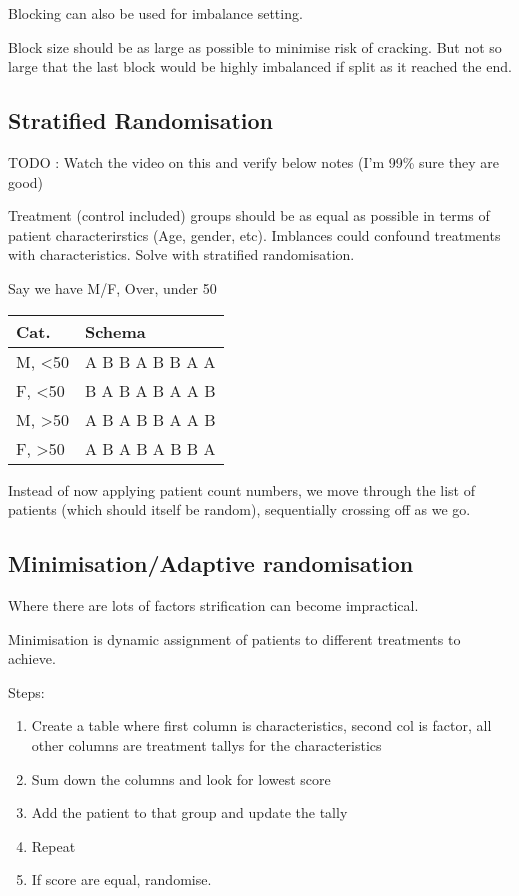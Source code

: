 \documentclass[
  letterpaper,
  DIV=11,
  numbers=noendperiod]{scrreprt}
\providecommand{\tightlist}{%
  \setlength{\itemsep}{0pt}\setlength{\parskip}{0pt}}\usepackage{longtable,booktabs,array}
\begin{document}
Blocking can also be used for imbalance setting.

Block size should be as large as possible to minimise risk of cracking.
But not so large that the last block would be highly imbalanced if split
as it reached the end.

\hypertarget{stratified-randomisation}{%
\subsection{Stratified Randomisation}\label{stratified-randomisation}}

TODO : Watch the video on this and verify below notes (I'm 99\% sure
they are good)

Treatment (control included) groups should be as equal as possible in
terms of patient characterirstics (Age, gender, etc). Imblances could
confound treatments with characteristics. Solve with stratified
randomisation.

Say we have M/F, Over, under 50

\begin{longtable}[]{@{}ll@{}}
\toprule()
Cat. & Schema \\
\midrule()
\endhead
M, \textless50 & A B B A B B A A \\
F, \textless50 & B A B A B A A B \\
M, \textgreater50 & A B A B B A A B \\
F, \textgreater50 & A B A B A B B A \\
\bottomrule()
\end{longtable}

Instead of now applying patient count numbers, we move through the list
of patients (which should itself be random), sequentially crossing off
as we go.

\hypertarget{minimisationadaptive-randomisation}{%
\subsection{Minimisation/Adaptive
randomisation}\label{minimisationadaptive-randomisation}}

Where there are lots of factors strification can become impractical.

Minimisation is dynamic assignment of patients to different treatments
to achieve.

Steps:

\begin{enumerate}
\def\labelenumi{\arabic{enumi})}
\tightlist
\item
  Create a table where first column is characteristics, second col is
  factor, all other columns are treatment tallys for the characteristics
\item
  Sum down the columns and look for lowest score
\item
  Add the patient to that group and update the tally
\item
  Repeat
\item
  If score are equal, randomise.
\end{enumerate}
\end{document}
